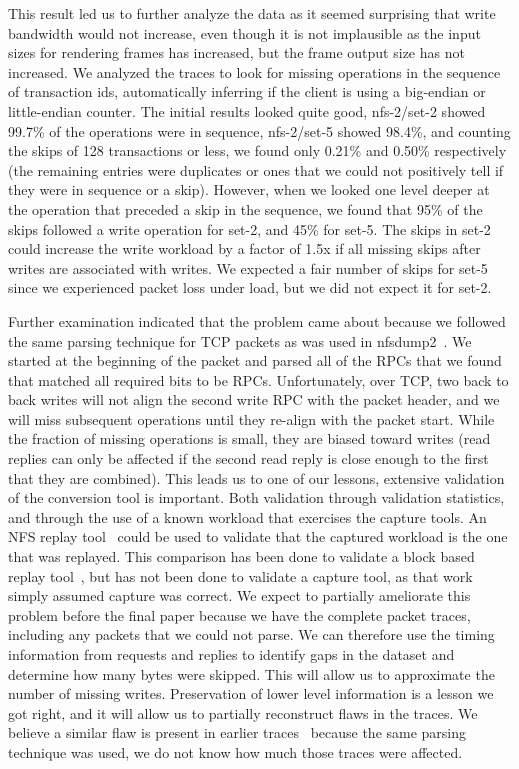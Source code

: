 This result led us to further analyze the data as it seemed surprising
that write bandwidth would not increase, even though it is not
implausible as the input sizes for rendering frames has increased, but
the frame output size has not increased.  We analyzed the traces to
look for missing operations in the sequence of transaction ids,
automatically inferring if the client is using a big-endian or
little-endian counter.  The initial results looked quite good,
nfs-2/set-2 showed 99.7\% of the operations were in sequence,
nfs-2/set-5 showed 98.4\%, and counting the skips of 128 transactions
or less, we found only 0.21\% and 0.50\% respectively (the remaining
entries were duplicates or ones that we could not positively tell if
they were in sequence or a skip).  However, when we looked one level
deeper at the operation that preceded a skip in the sequence, we
found that 95\% of the skips followed a write operation for set-2, and
45\% for set-5.  The skips in set-2 could increase the write workload
by a factor of 1.5x if all missing skips after writes are associated
with writes.  We expected a fair number of skips for set-5 since we
experienced packet loss under load, but we did not expect it for
set-2.

Further examination indicated that the problem came about because we
followed the same parsing technique for TCP packets as was used in
nfsdump2~\cite{ellardTraces}.  We started at the beginning of the
packet and parsed all of the RPCs that we found that matched all
required bits to be RPCs.  Unfortunately, over TCP, two back to back
writes will not align the second write RPC with the packet header, and
we will miss subsequent operations until they re-align with the packet
start.  While the fraction of missing operations is small, they are
biased toward writes (read replies can only be affected if the second
read reply is close enough to the first that they are combined).  This
leads us to one of our lessons, extensive validation of the conversion
tool is important.  Both validation through validation statistics, and
through the use of a known workload that exercises the capture tools.
An NFS replay tool~\cite{NingningFast05} could be used to validate
that the captured workload is the one that was replayed.  This
comparison has been done to validate a block based replay
tool~\cite{AndersonFast04}, but has not been done to validate a
capture tool, as that work simply assumed capture was correct.  We
expect to partially ameliorate this problem before the final paper
because we have the complete packet traces, including any packets that
we could not parse.  We can therefore use the timing information from
requests and replies to identify gaps in the dataset and determine how
many bytes were skipped.  This will allow us to approximate the number
of missing writes.  Preservation of lower level information is a
lesson we got right, and it will allow us to partially reconstruct
flaws in the traces.  We believe a similar flaw is present in earlier
traces~\cite{ellardTraces} because the same parsing technique was
used, we do not know how much those traces were affected.

